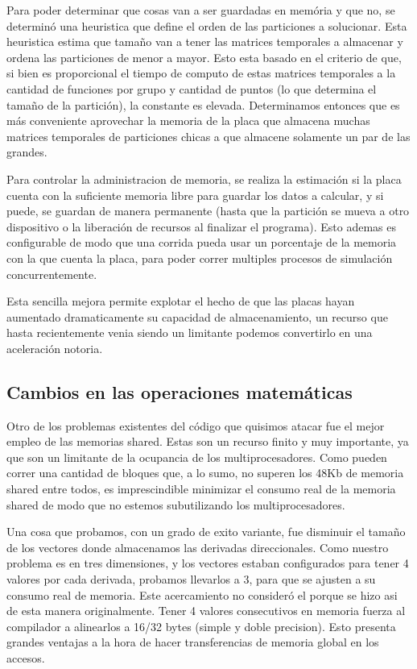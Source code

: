 Para poder determinar que cosas van a ser guardadas en mem\'oria y que no, se determin\'o una heuristica
que define el orden de las particiones a solucionar. Esta heuristica estima que tama\~no van a
tener las matrices temporales a almacenar y ordena las particiones de menor a mayor. Esto
esta basado en el criterio de que, si bien es proporcional el tiempo de computo de estas matrices
temporales a la cantidad de funciones por grupo y cantidad de puntos (lo que determina el tama\~no
de la partici\'on), la constante es elevada. Determinamos entonces que es m\'as conveniente
aprovechar la memoria de la placa que almacena muchas matrices temporales de particiones chicas
a que almacene solamente un par de las grandes.

Para controlar la administracion de memoria, se realiza la estimaci\'on si la placa cuenta
con la suficiente memoria libre para guardar los datos a calcular, y si puede, se guardan de manera
permanente (hasta que la partici\'on se mueva a otro dispositivo o la liberaci\'on de recursos al
finalizar el programa). Esto ademas es configurable de modo que una corrida pueda usar un porcentaje
de la memoria con la que cuenta la placa, para poder correr multiples procesos de simulaci\'on concurrentemente.

Esta sencilla mejora permite explotar el hecho de que las placas hayan aumentado dramaticamente su
capacidad de almacenamiento, un recurso que hasta recientemente venia siendo un limitante podemos
convertirlo en una aceleraci\'on notoria.


\subsection{Cambios en las operaciones matem\'aticas}
Otro de los problemas existentes del c\'odigo que quisimos atacar fue el mejor empleo de las
memorias shared. Estas son un recurso finito y muy importante, ya que son un limitante de
la ocupancia de los multiprocesadores. Como pueden correr una cantidad de bloques que, a lo sumo,
no superen los 48Kb de memoria shared entre todos, es imprescindible minimizar el consumo real
de la memoria shared de modo que no estemos subutilizando los multiprocesadores.

Una cosa que probamos, con un grado de exito variante, fue disminuir el tamaño de los vectores
donde almacenamos las derivadas direccionales. Como nuestro problema es en tres dimensiones,
y los vectores estaban configurados para tener 4 valores por cada derivada, probamos llevarlos a
3, para que se ajusten a su consumo real de memoria. Este acercamiento no consider\'o el porque
se hizo asi de esta manera originalmente. Tener 4 valores consecutivos en memoria fuerza
al compilador a alinearlos a 16/32 bytes (simple y doble precision).
Esto presenta grandes ventajas a la hora de hacer transferencias de memoria global en los accesos.

